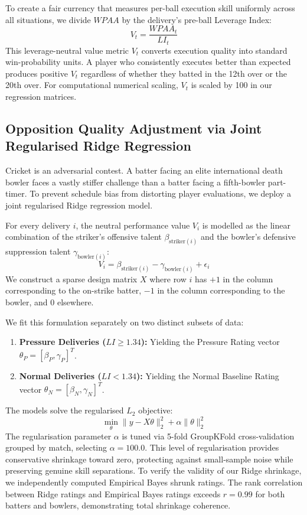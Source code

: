 \documentclass[11pt,a4paper]{article}
\begin{document}
To create a fair currency that measures per-ball execution skill uniformly across all situations, we divide $WPAA$ by the delivery's pre-ball Leverage Index:
\begin{equation}
    V_t = \frac{WPAA_t}{LI_t}
\end{equation}
This leverage-neutral value metric $V_t$ converts execution quality into standard win-probability units. A player who consistently executes better than expected produces positive $V_t$ regardless of whether they batted in the 12th over or the 20th over. For computational numerical scaling, $V_t$ is scaled by 100 in our regression matrices.

\subsection{Opposition Quality Adjustment via Joint Regularised Ridge Regression}
Cricket is an adversarial contest. A batter facing an elite international death bowler faces a vastly stiffer challenge than a batter facing a fifth-bowler part-timer. To prevent schedule bias from distorting player evaluations, we deploy a joint regularised Ridge regression model.

For every delivery $i$, the neutral performance value $V_i$ is modelled as the linear combination of the striker's offensive talent $\beta_{\text{striker}(i)}$ and the bowler's defensive suppression talent $\gamma_{\text{bowler}(i)}$:
\begin{equation}
    V_i = \beta_{\text{striker}(i)} - \gamma_{\text{bowler}(i)} + \epsilon_i
\end{equation}
We construct a sparse design matrix $X$ where row $i$ has $+1$ in the column corresponding to the on-strike batter, $-1$ in the column corresponding to the bowler, and $0$ elsewhere.

We fit this formulation separately on two distinct subsets of data:
\begin{enumerate}
    \item \textbf{Pressure Deliveries ($LI \ge 1.34$):} Yielding the Pressure Rating vector $\theta_P = [\beta_P, \gamma_P]^T$.
    \item \textbf{Normal Deliveries ($LI < 1.34$):} Yielding the Normal Baseline Rating vector $\theta_N = [\beta_N, \gamma_N]^T$.
\end{enumerate}
The models solve the regularised $L_2$ objective:
\begin{equation}
    \min_{\theta} \|y - X\theta\|_2^2 + \alpha \|\theta\|_2^2
\end{equation}
The regularisation parameter $\alpha$ is tuned via 5-fold GroupKFold cross-validation grouped by match, selecting $\alpha = 100.0$. This level of regularisation provides conservative shrinkage toward zero, protecting against small-sample noise while preserving genuine skill separations. To verify the validity of our Ridge shrinkage, we independently computed Empirical Bayes shrunk ratings. The rank correlation between Ridge ratings and Empirical Bayes ratings exceeds $r = 0.99$ for both batters and bowlers, demonstrating total shrinkage coherence.
\end{document}
